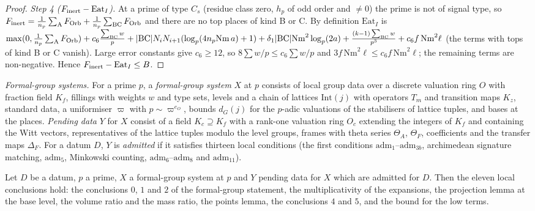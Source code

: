 \begin{proof}
\emph{Step 4 ($F_{\rm inert}-\mathrm{Eat}_I$).} At a prime of type $C_s$ (residue class zero, $h_p$ of odd order and $\ne0$)
the prime is not of signal type, so $F_{\rm inert}=\frac1{n_p}\sum_{\rm A}F_{\rm Orb}+\frac1{n_p}\sum_{\rm BC}F_{\rm Orb}$ and there
are no top places of kind B or C. By definition $\mathrm{Eat}_I$ is
$\max(0,\frac1{n_p}\sum_{\rm A}F_{\rm Orb})+c_6\frac{\sum_{\rm BC}w}p+|\mathrm{BC}|N_iN_{i+1}(\log_p(4n_p\mathrm{Nm}\,a)+1)
+\delta_1|\mathrm{BC}|\mathrm{Nm}^2\log_p(2a)+\frac{(k-1)\sum_{\rm BC}w}{p^3}+c_6f\,\mathrm{Nm}^2\ell$ (the terms with tops of kind
B or C vanish). Large error constants give $c_6\ge12$, so $8\sum w/p\le c_6\sum w/p$ and $3f\,\mathrm{Nm}^2\ell\le
c_6f\,\mathrm{Nm}^2\ell$; the remaining terms are non-negative. Hence $F_{\rm inert}-\mathrm{Eat}_I\le B$.
\end{proof}

\emph{Formal-group systems.} For a prime $p$, a \emph{formal-group system} $X$ at $p$ consists of local group data
over a discrete valuation ring $O$ with fraction field $K_f$, fillings with weights $w$ and type sets, levels and a
chain of lattices $\mathrm{Int}(j)$ with operators $T_m$ and transition maps $K_z$, standard data, a uniformiser
$\varpi$ with $p\sim\varpi^{e_O}$, bounds $d_G(j)$ for the $p$-adic valuations of the stabilisers of lattice tuples,
and bases at the places. \emph{Pending data} $Y$ for $X$ consist of a field $K_c\supseteq K_f$ with a rank-one valuation
ring $O_c$ extending the integers of $K_f$ and containing the Witt vectors, representatives of the lattice tuples
modulo the level groups, frames with theta series $\Theta_A$, $\Theta_F$, coefficients and the transfer maps
$\Delta_F$. For a datum $D$, $Y$ is \emph{admitted} if it satisfies thirteen local conditions (the first conditions
$\mathrm{adm}_1$--$\mathrm{adm}_{3b}$, archimedean signature matching, $\mathrm{adm}_5$, Minkowski counting,
$\mathrm{adm}_6$--$\mathrm{adm}_8$ and $\mathrm{adm}_{11}$).

\begin{theorem}\label{pf:top-shape:packet}
Let $D$ be a datum, $p$ a prime, $X$ a formal-group system at $p$ and $Y$ pending data for $X$ which are admitted for
$D$. Then the eleven local conclusions hold: the conclusions $0$, $1$ and $2$ of the formal-group statement, the
multiplicativity of the expansions, the projection lemma at the base level, the volume ratio and the mass ratio, the
points lemma, the conclusions $4$ and $5$, and the bound for the low terms.
\end{theorem}

